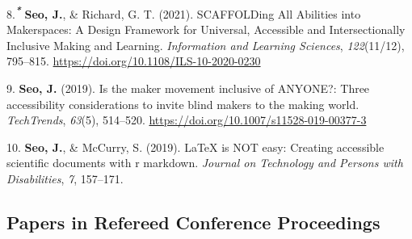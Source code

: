 \documentclass[11pt,a4paper,]{awesome-cv}
\newlength{\cslhangindent}
\newenvironment{CSLReferences}[2] %
 {\begin{list}{}{%
  \setlength{\itemindent}{0pt}
  \setlength{\leftmargin}{0pt}
  \setlength{\parsep}{0pt}
  \ifodd #1
   \setlength{\leftmargin}{\cslhangindent}
   \setlength{\itemindent}{-1\cslhangindent}
  \fi
  \setlength{\itemsep}{#2\baselineskip}}}
 {\end{list}}
\begin{document}
\begin{CSLReferences}{1}{0}
8.\textsuperscript{\textbf{\emph{*}}} \textbf{Seo, J.}, \& Richard, G.
T. (2021). SCAFFOLDing All Abilities into Makerspaces: A Design
Framework for Universal, Accessible and Intersectionally Inclusive
Making and Learning. \emph{Information and Learning Sciences},
\emph{122}(11/12), 795--815.
\url{https://doi.org/10.1108/ILS-10-2020-0230}

9. \textbf{Seo, J.} (2019). Is the maker movement inclusive of ANYONE?:
Three accessibility considerations to invite blind makers to the making
world. \emph{TechTrends}, \emph{63}(5), 514--520.
\url{https://doi.org/10.1007/s11528-019-00377-3}

10. \textbf{Seo, J.}, \& McCurry, S. (2019). LaTeX is NOT easy: Creating
accessible scientific documents with r markdown. \emph{Journal on
Technology and Persons with Disabilities}, \emph{7}, 157--171.

\end{CSLReferences}

\subsection{Papers in Refereed Conference
Proceedings}\label{papers-in-refereed-conference-proceedings}
\end{document}
